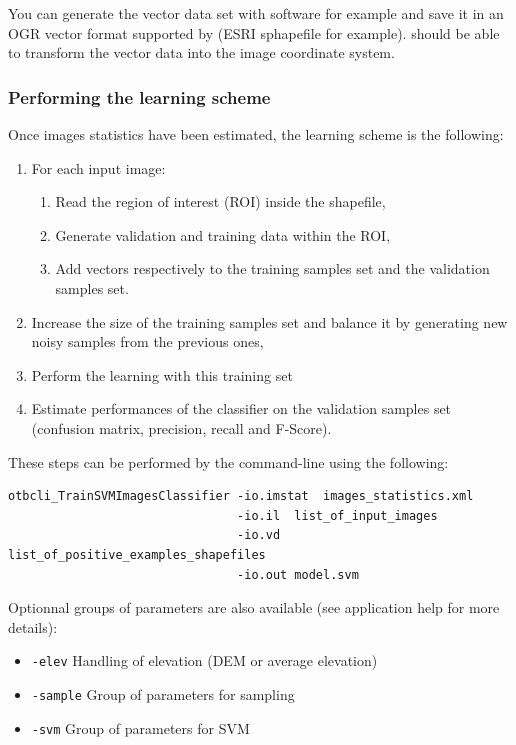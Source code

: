 You can generate the vector data set with \qgis software for
example and save it in an OGR vector format supported by \gdal (ESRI
sphapefile for example). \app should be able to transform the
vector data into the image coordinate system.

\subsubsection{Performing the learning scheme}

Once images statistics have been estimated, the learning scheme is the following:
\begin{enumerate}
  \item For each input image:
  \begin{enumerate}
    \item Read the region of interest (ROI) inside the shapefile,
    \item Generate validation and training data within the ROI,
    \item Add vectors respectively to the training samples set and the validation
    samples set.
  \end{enumerate}
  \item Increase the size of the training samples set and balance it by
  generating new noisy samples from the previous ones,
  \item Perform the learning with this training set
  \item Estimate performances of the classifier on the validation samples set
  (confusion matrix, precision, recall and F-Score).
\end{enumerate}

These steps can be performed by the 
command-line using the following:

\begin{verbatim}
otbcli_TrainSVMImagesClassifier -io.imstat  images_statistics.xml
                                -io.il  list_of_input_images
                                -io.vd  list_of_positive_examples_shapefiles
                                -io.out model.svm
\end{verbatim}

Optionnal groups of parameters are also available (see application help for
more details):
\begin{itemize}
\item \verb?-elev? Handling of elevation (DEM or average elevation)
\item \verb?-sample? Group of parameters for sampling
\item \verb?-svm? Group of parameters for SVM
\end{itemize}

